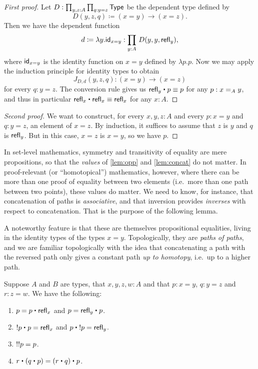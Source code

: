 \begin{proof}[First proof]
  Let $D:\prod_{y,z:A} \prod_{q:y=z} \type$ be the dependent type defined by
  \begin{equation*}
    D(y,z,q)\coloneqq(x= y)\to (x= z).
  \end{equation*}
  Then we have the dependent function
  \begin{equation*}
    d\coloneqq\lambda y.\idfunc[x= y]:\prod_{y:A}\, D(y,y,\refl{y}),
  \end{equation*}
  where $\idfunc[x= y]$ is the identity function on $x= y$ defined by $\lambda p.p$.
  Now we may apply the induction principle for identity types to obtain
  \[J_{D,d}(y,z,q):(x= y)\to(x= z)\]
  for every $q:y= z$.
  The conversion rule gives us $\refl{y}\ct p\jdeq p$ for any $p:\id[A]xy$, and thus in particular $\refl{x}\ct \refl{x}\jdeq \refl{x}$ for any $x:A$.
\end{proof}

\begin{proof}[Second proof]
  We want to construct, for every $x,y,z:A$ and every $p:x=y$ and $q:y=z$, an element of $x=z$.
  By induction, it suffices to assume that $z$ is $y$ and $q$ is $\refl{y}$.
  But in this case, $x=z$ is $x=y$, so we have $p$.
\end{proof}

In set-level mathematics, symmetry and transitivity of equality are mere propositions, so that the \emph{values} of \autoref{lem:opp} and \autoref{lem:concat} do not matter.
In proof-relevant (or ``homotopical'') mathematics, however, where there can be more than one proof of equality between two elements (i.e.\ more than one path between two points), these values do matter.
We need to know, for instance, that concatenation of paths is \emph{associative}, and that inversion provides \emph{inverses} with respect to concatenation.
That is the purpose of the following lemma.

A noteworthy feature is that these are themselves propositional equalities, living in the identity types of the types $x= y$.
Topologically, they are \emph{paths of paths}, and we are familiar topologically with the idea that concatenating a path with the reversed path only gives a constant path \emph{up to homotopy}, i.e.\ up to a higher path.

\begin{lem}%
  Suppose $A$ and $B$ are types, that $x,y,z,w:A$ and that $p:x= y$, $q:y = z$ and $r:z=w$.
  We have the following:
  \begin{enumerate}
  \item $p= p\ct \refl{x}$ and $p = \refl{y} \ct p$.
  \item $\opp{p}\ct p=  \refl{x}$ and $p\ct \opp{p}= \refl{y}$.
  \item $\opp{\opp{p}}= p$.
  \item $r\ct (q\ct p)=  (r\ct q)\ct p$.
  \end{enumerate}
\end{lem}

